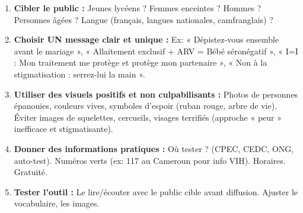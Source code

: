 \documentclass[11pt]{article}
\begin{document}
\begin{methode}
\begin{enumerate}
    \item \textbf{Cibler le public :} Jeunes lycéens ? Femmes enceintes ? Hommes ? Personnes âgées ? Langue (français, langues nationales, camfranglais) ?
    \item \textbf{Choisir UN message clair et unique :} Ex: « Dépistez-vous ensemble avant le mariage », « Allaitement exclusif + ARV = Bébé séronégatif », « I=I : Mon traitement me protège et protège mon partenaire », « Non à la stigmatisation : serrez-lui la main ».
    \item \textbf{Utiliser des visuels positifs et non culpabilisants :} Photos de personnes épanouies, couleurs vives, symboles d'espoir (ruban rouge, arbre de vie). Éviter images de squelettes, cercueils, visages terrifiés (approche « peur » inefficace et stigmatisante).
    \item \textbf{Donner des informations pratiques :} Où tester ? (CPEC, CEDC, ONG, auto-test). Numéros verts (ex: 117 au Cameroun pour info VIH). Horaires. Gratuité.
    \item \textbf{Tester l'outil :} Le lire/écouter avec le public cible avant diffusion. Ajuster le vocabulaire, les images.
\end{enumerate}
\end{methode}
\end{document}
